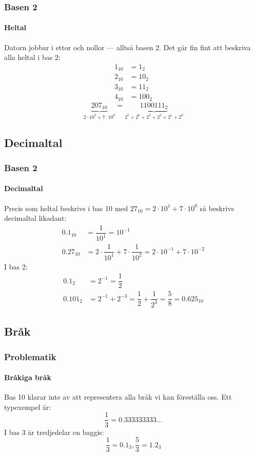 \documentclass[aspectratio=169]{beamer}
\begin{document}
\begin{frame}
\frametitle{Basen 2}
\framesubtitle{Heltal}

Datorn jobbar i ettor och nollor --- alltså basen 2. Det går fin fint att beskriva alla heltal i bas 2:
\[ \begin{aligned}
1_{10} &= 1_2\\
2_{10} &= 10_2\\
3_{10} &= 11_2\\
4_{10} &= 100_2
\end{aligned}
\]
\pause
\[
\underbrace{207_{10}}_{2\cdot10^2+7\cdot10^0} = \underbrace{1100111_2}_{2^7+2^6+2^3+2^2+2^1+2^0}
\]
\end{frame}

\subsection{Decimaltal}

\begin{frame}
\frametitle{Basen 2}
\framesubtitle{Decimaltal}

Precis som heltal beskrivs i bas 10 med \( 27_{10} = 2\cdot 10^1+7\cdot 10^0\) så beskrivs decimaltal likadant:
\[ \begin{aligned}
	0.1_{10} & = \dfrac{1}{10^1} = 10^{-1}\\
	0.27_{10} & = 2\cdot\dfrac{1}{10^1} + 7\cdot\dfrac{1}{10^2} = 2\cdot 10^{-1}+7\cdot10^{-2}
\end{aligned}
\] \pause
I bas 2:
\[ \begin{aligned}
	0.1_2 	& = 2^{-1} = \dfrac{1}{2}\\
	0.101_2 	& = 2^{-1}+2^{-3} = \dfrac{1}{2}+\dfrac{1}{2^3} = \dfrac{5}{8} = 0.625_{10}
\end{aligned} \]

\end{frame}

\subsection{Bråk}

\begin{frame}
\frametitle{Problematik}
\framesubtitle{Bråkiga bråk}

Bas 10 klarar inte av att representera alla bråk vi kan föreställa oss. Ett typexempel är:
\[ \frac{1}{3} = 0.333333333... \] \pause
I bas 3 är tredjedelar en baggis:
\[ \frac{1}{3} = 0.1_3, \frac{5}{3} = 1.2_3 \]


\end{frame}
\end{document}
